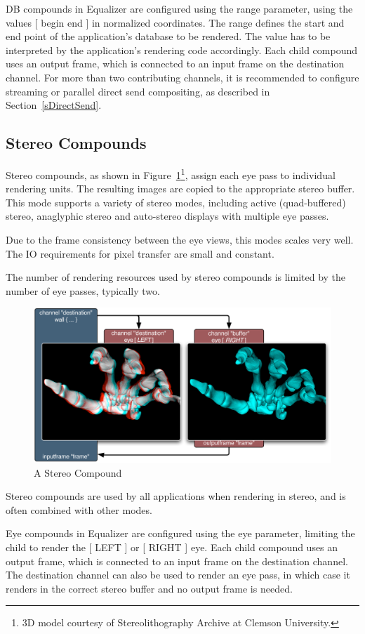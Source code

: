 \documentclass[10pt,a4]{scrartcl}
\newcommand{\fig}[1]{Figure~\ref{#1}}
\newcommand{\sref}[1]{Section~\ref{#1}}
\begin{document}
DB compounds in Equalizer are configured using the \textsf{range}
parameter, using the values \textsf{[ begin end ]} in normalized
coordinates. The range defines the start and end point of the
application's database to be rendered. The value has to be interpreted
by the application's rendering code accordingly.  Each child compound
uses an output frame, which is connected to an input frame on the
destination channel. For more than two contributing channels, it is
recommended to configure streaming or parallel direct send compositing,
as described in \sref{sDirectSend}.


\subsection{Stereo Compounds}

Stereo compounds, as shown in \fig{fStereoCmp}\footnote{3D model
  courtesy of Stereolithography Archive at Clemson University.}, assign
each eye pass to individual rendering units. The resulting images are
copied to the appropriate stereo buffer. This mode supports a variety of
stereo modes, including active (quad-buffered) stereo, anaglyphic stereo
and auto-stereo displays with multiple eye passes.

Due to the frame consistency between the eye views, this modes scales
very well. The IO requirements for pixel transfer are small and
constant.

The number of rendering resources used by stereo compounds is limited by
the number of eye passes, typically two. 

\begin{figure}
  \includegraphics[width=.618\textwidth]{images/EYE.pdf}
  {\caption{\label{fStereoCmp}\small A Stereo Compound}}
\end{figure}
Stereo compounds are used by all applications when rendering in stereo,
and is often combined with other modes.

Eye compounds in Equalizer are configured using the \textsf{eye}
parameter, limiting the child to render the \textsf{[ LEFT ]} or
\textsf{[ RIGHT ]} eye. Each child compound uses an output frame, which
is connected to an input frame on the destination channel. The
destination channel can also be used to render an eye pass, in which case
it renders in the correct stereo buffer and no output frame is needed.
\end{document}
